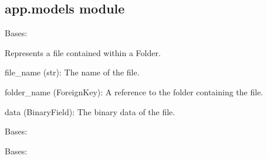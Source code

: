 \documentclass[letterpaper,10pt,english]{sphinxmanual}
\begin{document}
\subsection{app.models module}
\label{\detokenize{app:module-app.models}}\label{\detokenize{app:app-models-module}}

\begin{fulllineitems}
\label{\detokenize{app:app.models.File}}
\pysigstartsignatures
{}
\pysigstopsignatures
\sphinxAtStartPar
Bases: 

\sphinxAtStartPar
Represents a file contained within a Folder.
\begin{description}
\sphinxAtStartPar
file\_name (str): The name of the file.

\sphinxAtStartPar
folder\_name (ForeignKey): A reference to the folder containing the file.

\sphinxAtStartPar
data (BinaryField): The binary data of the file.

\end{description}

\begin{fulllineitems}
\label{\detokenize{app:app.models.File.DoesNotExist}}
\pysigstartsignatures
{}
\pysigstopsignatures
\sphinxAtStartPar
Bases: 

\end{fulllineitems}


\begin{fulllineitems}
\label{\detokenize{app:app.models.File.MultipleObjectsReturned}}
\pysigstartsignatures
{}
\pysigstopsignatures
\sphinxAtStartPar
Bases: 


\end{fulllineitems}
\end{fulllineitems}
\end{document}
